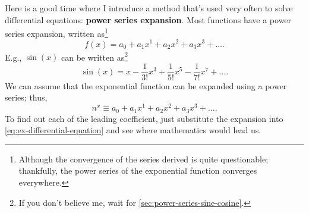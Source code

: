 Here is a good time where I introduce a method that's used very often to solve differential equations: \textbf{power series expansion}. Most functions have a power series expansion, written as\footnote{Although the convergence of the series derived is quite questionable; thankfully, the power series of the exponential function converges everywhere.}
\begin{equation}
	f(x) = a_0 + a_1x^1 + a_2x^2 + a_3x^3 + \dots.
\end{equation}
E.g., $\sin(x)$ can be written as\footnote{If you don't believe me, wait for \cref{sec:power-series-sine-cosine}.}
\begin{equation}
    \sin(x) = x - \frac{1}{3!}x^3 + \frac{1}{5!}x^5 - \frac{1}{7!}x^7 + \dots.
\end{equation}
We can assume that the exponential function can be expanded using a power series; thus,
\begin{equation}
	n^x \equiv a_0 + a_1x^1 + a_2x^2 + a_3x^3 + \dots.
\end{equation}
To find out each of the leading coefficient, just substitute the expansion into \cref{eq:ex-differential-equation} and see where mathematics would lead us.

